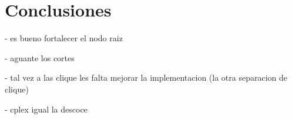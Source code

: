\section{Conclusiones}

- es bueno fortalecer el nodo raiz

- aguante los cortes


- tal vez a las clique les falta mejorar la implementacion (la otra separacion de clique)



- cplex igual la descoce